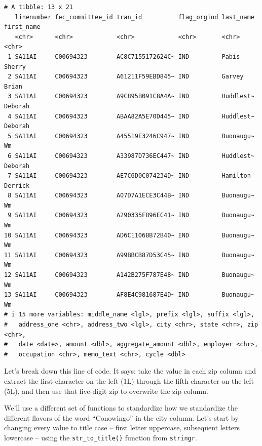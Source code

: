 \documentclass[
  letterpaper,
  DIV=11,
  numbers=noendperiod]{scrreprt}
\begin{document}
\begin{verbatim}
# A tibble: 13 x 21
   linenumber fec_committee_id tran_id          flag_orgind last_name first_name
   <chr>      <chr>            <chr>            <chr>       <chr>     <chr>     
 1 SA11AI     C00694323        AC8C7155172624C~ IND         Pabis     Sherry    
 2 SA11AI     C00694323        A61211F59EBD845~ IND         Garvey    Brian     
 3 SA11AI     C00694323        A9C895B091C8A4A~ IND         Huddlest~ Deborah   
 4 SA11AI     C00694323        ABAA82A5E70D445~ IND         Huddlest~ Deborah   
 5 SA11AI     C00694323        A45519E3246C947~ IND         Buonaugu~ Wm        
 6 SA11AI     C00694323        A33987D736EC447~ IND         Huddlest~ Deborah   
 7 SA11AI     C00694323        AE7C6D0C074234D~ IND         Hamilton  Derrick   
 8 SA11AI     C00694323        A07D7A1ECE3C44B~ IND         Buonaugu~ Wm        
 9 SA11AI     C00694323        A290335F896EC41~ IND         Buonaugu~ Wm        
10 SA11AI     C00694323        AD6C11068B72B40~ IND         Buonaugu~ Wm        
11 SA11AI     C00694323        A99BBCB87D53C45~ IND         Buonaugu~ Wm        
12 SA11AI     C00694323        A142B275F787E48~ IND         Buonaugu~ Wm        
13 SA11AI     C00694323        AF8E4C981687E4D~ IND         Buonaugu~ Wm        
# i 15 more variables: middle_name <lgl>, prefix <lgl>, suffix <lgl>,
#   address_one <chr>, address_two <lgl>, city <chr>, state <chr>, zip <chr>,
#   date <date>, amount <dbl>, aggregate_amount <dbl>, employer <chr>,
#   occupation <chr>, memo_text <chr>, cycle <dbl>
\end{verbatim}

Let's break down this line of code. It says: take the value in each zip
column and extract the first character on the left (1L) through the
fifth character on the left (5L), and then use that five-digit zip to
overwrite the zip column.

We'll use a different set of functions to standardize how we standardize
the different flavors of the word ``Conowingo'' in the city column.
Let's start by changing every value to title case -- first letter
uppercase, subsequent letters lowercase -- using the
\texttt{str\_to\_title()} function from \texttt{stringr}.
\end{document}
